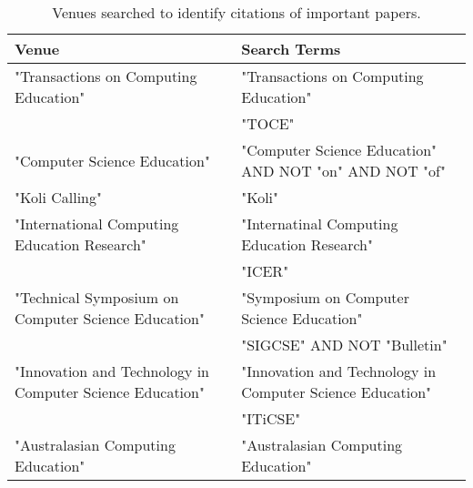 \begin{table*}[t]
\begin{tabular}{ll}
Venue & Search Terms\\\hline
"Transactions on Computing Education" & "Transactions on Computing Education"\\
& "TOCE"\\
"Computer Science Education" & "Computer Science Education" AND NOT "on" AND NOT "of"\\
"Koli Calling" & "Koli"\\
"International Computing Education Research" & "Internatinal Computing Education Research"\\
& "ICER"\\
"Technical Symposium on Computer Science Education" & "Symposium on Computer Science Education"\\
& "SIGCSE" AND NOT "Bulletin"\\
"Innovation and Technology in Computer Science Education" & "Innovation and Technology in Computer Science Education"\\
& "ITiCSE"\\
"Australasian Computing Education" & "Australasian Computing Education"
\end{tabular}
\caption{Venues searched to identify citations of important papers.}
\end{table*}